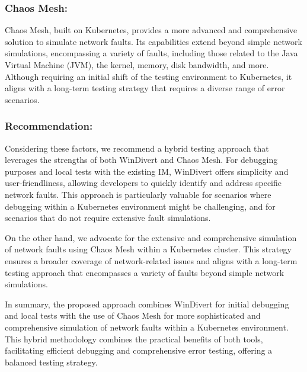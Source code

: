 \subsubsection{Chaos Mesh:}
Chaos Mesh, built on Kubernetes, provides a more advanced and comprehensive solution to simulate network faults. Its capabilities extend beyond simple network simulations, encompassing a variety of faults, including those related to the Java Virtual Machine (JVM), the kernel, memory, disk bandwidth, and more. Although requiring an initial shift of the testing environment to Kubernetes, it aligns with a long-term testing strategy that requires a diverse range of error scenarios.

\subsubsection{Recommendation:}
Considering these factors, we recommend a hybrid testing approach that leverages the strengths of both WinDivert and Chaos Mesh. For debugging purposes and local tests with the existing \ac{IM}, WinDivert offers simplicity and user-friendliness, allowing developers to quickly identify and address specific network faults. This approach is particularly valuable for scenarios where debugging within a Kubernetes environment might be challenging, and for scenarios that do not require extensive fault simulations.

On the other hand, we advocate for the extensive and comprehensive simulation of network faults using Chaos Mesh within a Kubernetes cluster. This strategy ensures a broader coverage of network-related issues and aligns with a long-term testing approach that encompasses a variety of faults beyond simple network simulations.

In summary, the proposed approach combines WinDivert for initial debugging and local tests with the use of Chaos Mesh for more sophisticated and comprehensive simulation of network faults within a Kubernetes environment. This hybrid methodology combines the practical benefits of both tools, facilitating efficient debugging and comprehensive error testing, offering a balanced testing strategy.